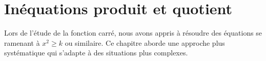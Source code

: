 \documentclass[main.tex]{subfiles}
\begin{document}
 
\cleardoublepage
{}  
\pagestyle{scrheadings} %
\onehalfspacing 
\setcounter{chapter}{15}
\chapter{Inéquations produit et quotient}
	 
Lors de l'étude de la fonction carré, nous avons appris à résoudre des équations se ramenant à $x^2\geqslant k$ ou similaire. Ce chapitre aborde une approche plus systématique qui s'adapte à des situations plus complexes.

 
%	   
					
										
														
\newpage 
{}  
\pagestyle{scrheadings} %
\onehalfspacing
\end{document}
